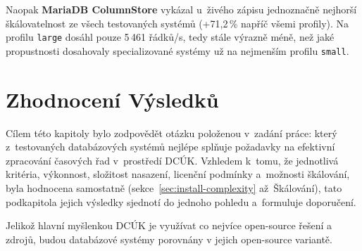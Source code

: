 Naopak \textbf{MariaDB ColumnStore} vykázal u~živého zápisu jednoznačně nejhorší škálovatelnost ze všech testovaných systémů (+71,2\,\% napříč všemi profily). 
Na profilu \texttt{large} dosáhl pouze 5\,461 řádků/s, tedy stále výrazně méně, než jaké propustnosti dosahovaly specializované systémy už na nejmenším profilu \texttt{small}. 

\section{Zhodnocení Výsledků}
\label{sec:evaluation-summary}

Cílem této kapitoly bylo zodpovědět otázku položenou v~zadání práce: který z~testovaných databázových systémů nejlépe splňuje požadavky na efektivní zpracování časových řad v~prostředí DCÚK. Vzhledem k~tomu, že jednotlivá kritéria, výkonnost, složitost nasazení, licenční podmínky a~možnosti škálování, byla hodnocena samostatně 
(sekce~\ref{sec:install-complexity} až~Škálování), tato podkapitola 
jejich výsledky sjednotí do jednoho pohledu a~formuluje doporučení.

Jelikož hlavní myšlenkou DCÚK je využívat co nejvíce open-source řešení a zdrojů, budou databázové systémy porovnány v jejich open-source variantě.

\begin{table}[H]
\centering
\caption{Souhrnné hodnocení testovaných databázových systémů}
\label{tab:final-summary}
\end{table}

